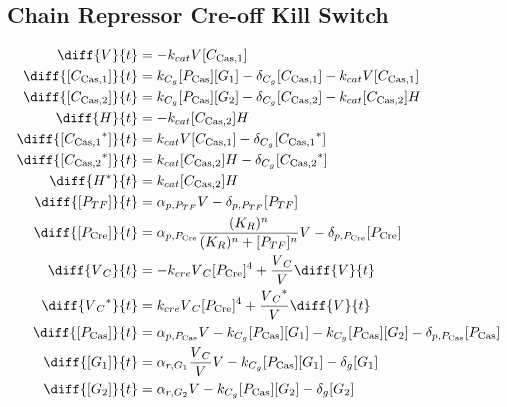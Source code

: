 \subsection{Chain Repressor Cre-off Kill Switch}
\label{s:Chain_Repressor_Cre_off_Kill_Switch}

\begin{align}
\diff{\vectorGen{}}{t} & = - \casCutRate{{}}\vectorGen{}\conc{\cplx{\cas}{1}}\\
\diff{\conc{\cplx{\cas}{1}}}{t} & =  \gRnaBind{}\conc{\proSp{\cas{}}}\conc{\gRna{1}} - \casCompDegradeRate{}\conc{\cplx{\cas}{1}} - \casCutRate{{}}\vectorGen{}\conc{\cplx{\cas}{1}}\\
\diff{\conc{\cplx{\cas}{2}}}{t} & =  \gRnaBind{}\conc{\proSp{\cas{}}}\conc{\gRna{2}} - \casCompDegradeRate{}\conc{\cplx{\cas}{2}} - \casCutRate{{}}\conc{\cplx{\cas}{2}}\hostGen{}\\
\diff{\hostGen{}}{t} & = - \casCutRate{{}}\conc{\cplx{\cas}{2}}\hostGen{}\\
\diff{\conc{\bound{\cplx{\cas}{1}}}}{t} & =  \casCutRate{{}}\vectorGen{}\conc{\cplx{\cas}{1}} - \casCompDegradeRate{}\conc{\bound{\cplx{\cas}{1}}}\\
\diff{\conc{\bound{\cplx{\cas}{2}}}}{t} & =  \casCutRate{{}}\conc{\cplx{\cas}{2}}\hostGen{} - \casCompDegradeRate{}\conc{\bound{\cplx{\cas}{2}}}\\
\diff{\edited{\hostGen{}}}{t} & =  \casCutRate{{}}\conc{\cplx{\cas}{2}}\hostGen{}\\
\diff{\conc{\proSp{TF}}}{t} & =  \txtlRate{\proSp{TF}}\vectorGen{} - \proDegradeRate{\proSp{TF}}\conc{\proSp{TF}}\\
\diff{\conc{\proSp{\cre{}}}}{t} & =  \txtlRate{\proSp{\cre{}}}\frac{(K_R)^n}{(K_R)^n + \conc{\proSp{TF}}^n}\vectorGen{} - \proDegradeRate{\proSp{\cre{}}}\conc{\proSp{\cre{}}}\\
\diff{\vectorGen{}_C}{t} & = - \creCutRate{} \vectorGen{}_C \conc{\proSp{\cre{}}}^4 + \frac{\vectorGen{}_C}{\vectorGen{}} \diff{\vectorGen{}}{t}\\
\diff{\edited{\vectorGen{}_C}}{t} & =  \creCutRate{} \vectorGen{}_C \conc{\proSp{\cre{}}}^4 + \frac{\edited{\vectorGen{}_C}}{\vectorGen{}} \diff{\vectorGen{}}{t}\\
\diff{\conc{\proSp{\cas{}}}}{t} & =  \txtlRate{\proSp{\cas{}}}\vectorGen{} - \gRnaBind{}\conc{\proSp{\cas{}}}\conc{\gRna{1}} - \gRnaBind{}\conc{\proSp{\cas{}}}\conc{\gRna{2}} - \proDegradeRate{\proSp{\cas{}}}\conc{\proSp{\cas{}}}\\
\diff{\conc{\gRna{1}}}{t} & =  \txRate{\gRna{1}}\frac{\vectorGen{}_C}{\vectorGen{}}\vectorGen{} - \gRnaBind{}\conc{\proSp{\cas{}}}\conc{\gRna{1}} - \rnaDegradeRate{}\conc{\gRna{1}}\\
\diff{\conc{\gRna{2}}}{t} & =  \txRate{\gRna{2}}\vectorGen{} - \gRnaBind{}\conc{\proSp{\cas{}}}\conc{\gRna{2}} - \rnaDegradeRate{}\conc{\gRna{2}}
\end{align}

